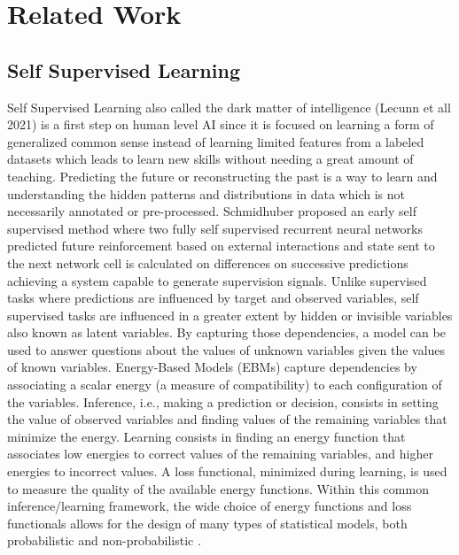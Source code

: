 \documentclass[twocolumn,conference]{article}
\begin{document}
\section{Related Work}\label{related-work}
\subsection{Self Supervised Learning}
Self Supervised Learning also called the dark matter of intelligence (Lecunn et all 2021) is a first step on human level AI since it is focused on learning a form of generalized common sense instead of learning limited features from a labeled datasets which leads to learn new skills without needing a great amount of teaching. Predicting the future or reconstructing the past is a way to learn and understanding the hidden patterns and distributions in data which is not necessarily annotated or pre-processed. Schmidhuber proposed an early self supervised method \cite{schmidhuber1990making} where two fully self supervised recurrent neural networks predicted future reinforcement based on external interactions and state sent to the next network cell is calculated on differences on successive predictions achieving a system capable to generate supervision signals. Unlike supervised tasks where predictions are influenced by target and observed variables, self supervised tasks are influenced in a greater extent by hidden or invisible variables also known as latent variables. By capturing those dependencies, a model can be used to answer questions about the values of unknown variables given the values of known variables. Energy-Based Models (EBMs) capture dependencies by associating a scalar energy (a measure of compatibility) to each configuration of the variables. Inference, i.e., making a prediction or decision, consists in setting the value of observed variables and finding values of the remaining variables that minimize the energy. Learning consists in finding an energy function that associates low energies to correct values of the remaining variables, and higher energies to incorrect values. A loss functional, minimized during learning, is used to measure the quality of the available energy functions. Within this common inference/learning framework, the wide choice of energy functions and loss functionals allows for the design of many types of statistical models, both probabilistic and non-probabilistic \cite{lecun2006tutorial}.
\end{document}

